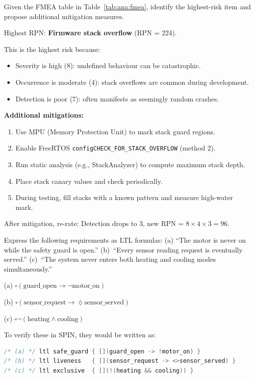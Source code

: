 \begin{example}
Given the FMEA table in Table~\ref{tab:ana:fmea}, identify the highest-risk item and propose additional mitigation measures.

\begin{solution}
Highest RPN: \textbf{Firmware stack overflow} (RPN = 224).

This is the highest risk because:
\begin{itemize}[nosep]
  \item Severity is high (8): undefined behaviour can be catastrophic.
  \item Occurrence is moderate (4): stack overflows are common during development.
  \item Detection is poor (7): often manifests as seemingly random crashes.
\end{itemize}

\textbf{Additional mitigations:}
\begin{enumerate}[nosep]
  \item Use MPU (Memory Protection Unit) to mark stack guard regions.
  \item Enable FreeRTOS \texttt{configCHECK\_FOR\_STACK\_OVERFLOW} (method 2).
  \item Run static analysis (e.g., StackAnalyzer) to compute maximum stack depth.
  \item Place stack canary values and check periodically.
  \item During testing, fill stacks with a known pattern and measure high-water mark.
\end{enumerate}

After mitigation, re-rate: Detection drops to 3, new RPN = $8 \times 4 \times 3 = 96$.
\end{solution}
\end{example}

\begin{example}
Express the following requirements as LTL formulas:
(a) ``The motor is never on while the safety guard is open.''
(b)~``Every sensor reading request is eventually served.''
(c)~``The system never enters both heating and cooling modes simultaneously.''

\begin{solution}
(a) $\square(\text{guard\_open} \rightarrow \neg\text{motor\_on})$

(b) $\square(\text{sensor\_request} \rightarrow \lozenge \text{sensor\_served})$

(c) $\square \neg (\text{heating} \land \text{cooling})$

To verify these in SPIN, they would be written as:
\begin{lstlisting}[language=C, style=C, numbers=none]
/* (a) */ ltl safe_guard { [](guard_open -> !motor_on) }
/* (b) */ ltl liveness   { [](sensor_request -> <>sensor_served) }
/* (c) */ ltl exclusive  { [](!(heating && cooling)) }
\end{lstlisting}
\end{solution}
\end{example}

